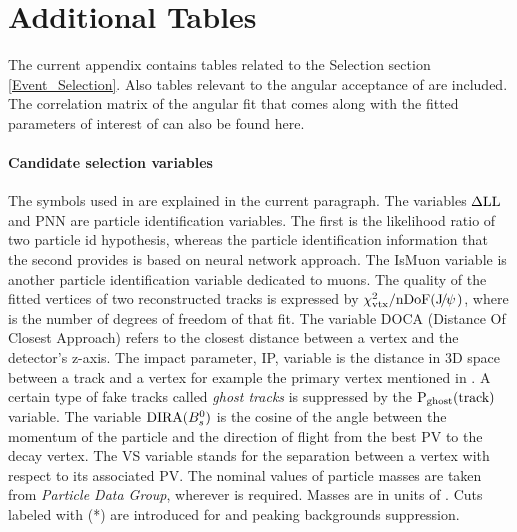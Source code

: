 
\chapter{Additional Tables}
\label{AdditionalTables}

The current appendix contains tables related to the Selection section \ref{Event_Selection}.
Also tables relevant to the angular acceptance of  are included.
The correlation matrix of the angular fit that comes along with the fitted parameters
of interest of  can also be found here.

\subsubsection{Candidate selection variables}
The symbols used in  are explained in the current paragraph.
The variables $\rm \Delta LL$ and PNN are particle identification variables. The first is the
likelihood ratio of two particle id hypothesis, whereas the particle identification information 
that the second provides is based on neural network approach. The IsMuon variable is another
particle identification variable dedicated to muons. The quality of the fitted vertices
of two reconstructed tracks is expressed by $\chi^2_{\rm vtx}/\rm nDoF({J\mskip -3mu/\mskip -2mu\psi\mskip 2mu})$, where \nDoF
is the number of degrees of freedom of that fit. The variable DOCA (Distance Of Closest Approach)
refers to the closest distance between a vertex and the detector's z-axis. The impact parameter,
IP, variable is the distance in 3D space between a track and a vertex for example the primary vertex mentioned in .
A certain type of fake tracks called {\it ghost tracks} is suppressed by the $\text{P}_{\rm ghost}(\rm track)$
variable. The variable ${\rm DIRA}(B^0_s)$ is the cosine of the angle between the momentum of the \Bs particle
and the direction of flight from the best PV to the \Bs decay vertex. The VS variable stands for
the separation between a vertex with respect to its associated PV. The nominal values of particle
masses are taken from {\it Particle Data Group}\cite{PDG}, wherever is required. Masses are in units of \mevcc. Cuts labeled with (*) are introduced
for \LbJpsipK and \LbJpsippi peaking backgrounds suppression.

